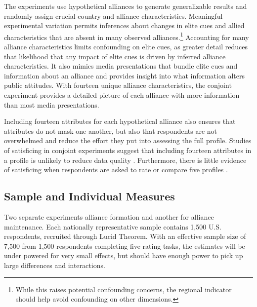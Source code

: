 \documentclass[12pt]{article}
\begin{document}
The experiments use hypothetical alliances to generate generalizable results and randomly assign crucial country and alliance characteristics. 
Meaningful experimental variation permits inferences about changes in elite cues and allied characteristics that are absent in many observed alliances.\footnote{While this raises potential confounding concerns, the regional indicator should help avoid confounding on other dimensions.}
Accounting for many alliance characteristics limits confounding on elite cues, as greater detail reduces that likelihood that any impact of elite cues is driven by inferred alliance characteristics.
It also mimics media presentations that bundle elite cues and information about an alliance and provides insight into what information alters public attitudes. 
With fourteen unique alliance characteristics, the conjoint experiment provides a detailed picture of each alliance with more information than most media presentations.


Including fourteen attributes for each hypothetical alliance also ensures that attributes do not mask one another, but also that respondents are not overwhelmed and reduce the effort they put into assessing the full profile.
Studies of satisficing in conjoint experiments suggest that including fourteen attributes in a profile is unlikely to reduce data quality \citep{Bansaketal2019}. 
Furthermore, there is little evidence of satisficing when respondents are asked to rate or compare five profiles \citep{Bansaketal2018}.



\subsection{Sample and Individual Measures}


Two separate experiments alliance formation and another for alliance maintenance. 
Each nationally representative sample contains 1,500 U.S. respondents, recruited through Lucid Theorem.
With an effective sample size of 7,500 from 1,500 respondents completing five rating tasks, the estimates will be under powered for very small effects, but should have enough power to pick up large differences and interactions. 
\end{document}
